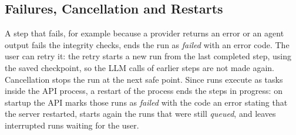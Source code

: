 \subsection{Failures, Cancellation and Restarts}
\label{sec:sd-failures}

A step that fails, for example because a provider returns an error or an agent output fails the integrity checks, ends the run as \emph{failed} with an error code. The user can retry it: the retry starts a new run from the last completed step, using the saved checkpoint, so the LLM calls of earlier steps are not made again. Cancellation stops the run at the next safe point. Since runs execute as tasks inside the API process, a restart of the process ends the steps in progress: on startup the API marks those runs as \emph{failed} with the code an error stating that the server restarted, starts again the runs that were still \emph{queued}, and leaves interrupted runs waiting for the user.
